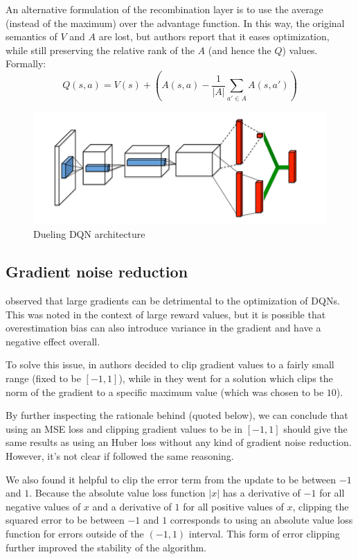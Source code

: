 \documentclass[a4paper,10pt]{report}
\begin{document}
An alternative formulation of the recombination layer is to use the average (instead of the maximum) over the advantage function. In this way, the original semantics of $V$ and $A$ are lost, but authors report that it eases optimization, while still preserving the relative rank of the $A$ (and hence the $Q$) values. Formally:
$$
Q(s,a)=V(s) + \left(A(s,a) - \frac{1}{|A|}\sum_{a'\in A}A(s,a')\right)
$$

\begin{figure}[h]
	\includegraphics[width=\textwidth]{dueling-dqn.png}
	\caption{Dueling DQN architecture}
	\label{fig:dueling-dqn}
\end{figure}

\subsection{Gradient noise reduction}
\citeauthor{atari-dqn} observed that large gradients can be detrimental to the optimization of DQNs. This was noted in the context of large reward values, but it is possible that overestimation bias can also introduce variance in the gradient and have a negative effect overall.

To solve this issue, in \cite{atari-dqn} authors decided to clip gradient values to a fairly small range (fixed to be $[-1,1]$), while in \cite{per} they went for a solution which clips the norm of the gradient to a specific maximum value (which was chosen to be $10$).

By further inspecting the rationale behind \citeauthor{atari-dqn} (quoted below), we can conclude that using an MSE loss and clipping gradient values to be in $[-1,1]$ should give the same results as using an Huber loss without any kind of gradient noise reduction. However, it's not clear if \citeauthor{per} followed the same reasoning.
\begin{displayquote}
	We also found it helpful to clip the error term from the update to be between $-1$ and $1$. Because the absolute value loss function $|x|$ has a derivative of $-1$ for all negative values of $x$ and a derivative of $1$ for all positive values of $x$, clipping the squared error to be between $-1$ and $1$ corresponds to using an absolute value loss function for errors outside of the $(-1,1)$ interval. This form of error clipping further improved the stability of the algorithm.
\end{displayquote}
\end{document}
